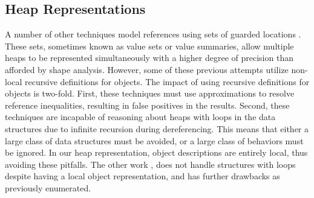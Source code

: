 \subsection{Heap Representations}
A number of other techniques model references using sets of guarded locations \cite{Xie:2005,Cherem:2007,Dillig:2011}. These sets, sometimes known as value sets or value summaries, allow multiple heaps to be represented simultaneously with a higher degree of precision than afforded by shape analysis. However, some of these previous attempts  \cite{Xie:2005,Cherem:2007} utilize non-local recursive definitions for objects. The impact of using recursive definitions for objects is two-fold. First, these techniques must use approximations to resolve reference inequalities, resulting in false positives in the results. Second, these techniques are incapable of reasoning about heaps with loops in the data structures due to infinite recursion during dereferencing. This means that either a large class of data structures must be avoided, or a large class of behaviors must be ignored. In our heap representation, object descriptions are entirely local, thus avoiding these pitfalls. The other work \cite{Dillig:2011}, does not handle structures with loops despite having a local object representation, and has further drawbacks as previously enumerated.